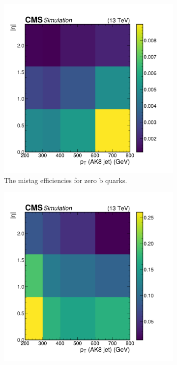 \begin{figure}[ht]
\centering
\begin{subfigure}[b]{0.33\textwidth}
         \includegraphics[width=\textwidth]{Chapters/Strategy/0b.png}
         \caption{The mistag efficiencies for zero b quarks.}
     \end{subfigure}
     \begin{subfigure}[b]{0.33\textwidth}
         \includegraphics[width=\textwidth]{Chapters/Strategy/1b.png}

\end{subfigure}
\end{figure}

